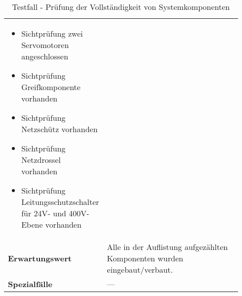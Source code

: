 \documentclass[../../../Bachelorarbeit.tex]{subfiles}
\begin{document}
\begin{table}[H]
\begin{tabular}{ p{0.34\linewidth}  p{0.6\linewidth} }
{\begin{itemize}[noitemsep,topsep=0pt,parsep=0pt,partopsep=0pt,leftmargin=*]
                                                \item Sichtprüfung zwei Servomotoren angeschlossen
                                                \item Sichtprüfung Greifkomponente vorhanden
                                                \item Sichtprüfung Netzschütz vorhanden
                                                \item Sichtprüfung Netzdrossel vorhanden
                                                \item Sichtprüfung Leitungsschutzschalter für 24V- und 400V-Ebene vorhanden
                                            \end{itemize}} \\
        \textbf{Erwartungswert}         & Alle in der Auflistung aufgezählten Komponenten wurden eingebaut/verbaut. \\
        \textbf{Spezialfälle}           & --- \\ \hline
    \end{tabular}
    \caption[\acs{tf} - Vollständigkeitsprüfung]{Testfall - Prüfung der Vollständigkeit von Systemkomponenten}
    \label{tab:my-table60}
\end{table}
\end{document}
